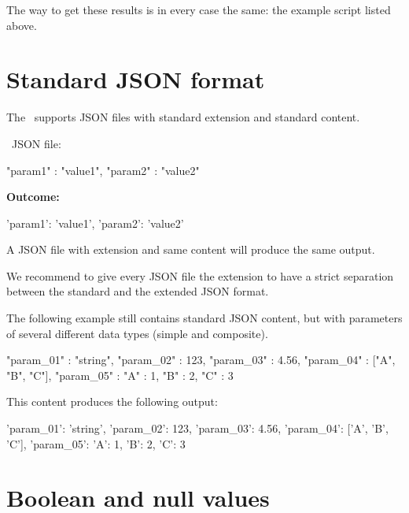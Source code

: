 The way to get these results is in every case the same: the example script listed above.



\section{Standard JSON format}

The \pkg\ supports JSON files with standard extension  and standard content.

\textbullet\ JSON file:

\begin{pythoncode}
{
   "param1" : "value1",
   "param2" : "value2"
}
\end{pythoncode}

\textbf{Outcome:}

\begin{pythonlog}
{'param1': 'value1', 'param2': 'value2'}
\end{pythonlog}

A JSON file with extension  and same content will produce the same output.

We recommend to give every JSON file the extension  to have a strict separation between the standard and the extended JSON format.

The following example still contains standard JSON content, but with parameters of several different data types (simple and composite).

\begin{pythoncode}
{
   "param_01" : "string",
   "param_02" : 123,
   "param_03" : 4.56,
   "param_04" : ["A", "B", "C"],
   "param_05" : {"A" : 1, "B" : 2, "C" : 3}
}
\end{pythoncode}

This content produces the following output:

\begin{pythonlog}
{'param_01': 'string',
 'param_02': 123,
 'param_03': 4.56,
 'param_04': ['A', 'B', 'C'],
 'param_05': {'A': 1, 'B': 2, 'C': 3}}
\end{pythonlog}



\section{Boolean and null values}


